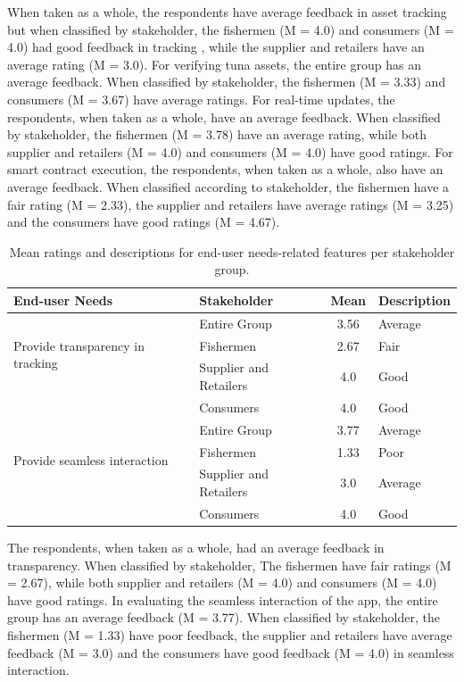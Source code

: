 	When taken as a whole, the respondents have average feedback in asset tracking but when classified by stakeholder, the fishermen (M = 4.0) and consumers (M = 4.0) had good feedback in tracking , while the supplier and retailers have an average rating (M = 3.0). For verifying tuna assets, the entire group has an average feedback. When classified by stakeholder, the fishermen (M = 3.33) and consumers (M = 3.67) have average ratings.  For real-time updates, the respondents, when taken as a whole, have an average feedback. When classified by stakeholder, the fishermen (M = 3.78) have an average rating, while both supplier and retailers (M = 4.0) and consumers (M = 4.0) have good ratings. For smart contract execution, the respondents, when taken as a whole, also have an average feedback. When classified according to stakeholder, the fishermen have a fair rating (M = 2.33), the supplier and retailers have average ratings (M = 3.25) and the consumers have good ratings (M = 4.67).
	
	\begin{table}[h]
		\centering
		\begin{tabular}{|l|l|c|l|}
			\hline
			\textbf{End-user Needs} & \textbf{Stakeholder} & \textbf{Mean} & \textbf{Description} \\ \hline
			\multirow{3}{*}{Provide transparency in tracking} 
			& Entire Group & 3.56 & Average \\ \cline{2-4}
			& Fishermen & 2.67 & Fair \\ \cline{2-4}
			& Supplier and Retailers & 4.0 & Good \\ \cline{2-4}
			& Consumers & 4.0 & Good \\ \hline
			
			\multirow{3}{*}{Provide seamless interaction} 
			& Entire Group & 3.77 & Average \\ \cline{2-4}
			& Fishermen & 1.33 & Poor \\ \cline{2-4}
			& Supplier and Retailers & 3.0 & Average \\ \cline{2-4}
			& Consumers & 4.0 & Good \\ \hline
			
		\end{tabular}
		\caption{Mean ratings and descriptions for end-user needs-related features per stakeholder group.}
		\label{tab:end-user}
	\end{table}
	
	The respondents, when taken as a whole, had an average feedback in transparency. When classified by stakeholder, The fishermen have fair ratings (M = 2.67), while both supplier and retailers (M = 4.0) and consumers (M = 4.0) have good ratings. In evaluating the seamless interaction of the app, the entire group has an average feedback (M = 3.77). When classified by stakeholder, the fishermen (M = 1.33) have poor feedback, the supplier and retailers have average feedback (M = 3.0) and the consumers have good feedback (M = 4.0) in seamless interaction.
	
